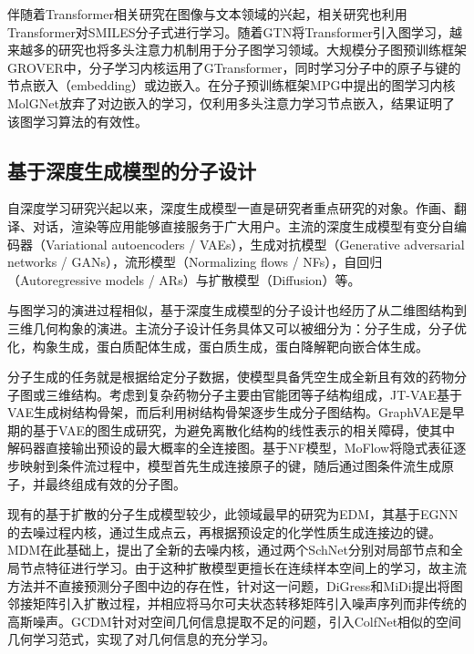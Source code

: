 伴随着Transformer\cite{transformer_vaswani_17}相关研究在图像与文本领域的兴起，相关研究\cite{smilestrans_honda_19,smilesbert_wang_19,chemberta_chithrananda_20}也利用Transformer对SMILES分子式进行学习。随着GTN\cite{gtn_yun_19}将Transformer引入图学习，越来越多的研究也将多头注意力机制用于分子图学习领域。大规模分子图预训练框架GROVER\cite{grover_rong_20}中，分子学习内核运用了GTransformer，同时学习分子中的原子与键的节点嵌入（embedding）或边嵌入。在分子预训练框架MPG\cite{mpg_li_21}中提出的图学习内核MolGNet放弃了对边嵌入的学习，仅利用多头注意力学习节点嵌入，结果证明了该图学习算法的有效性。

\subsection{基于深度生成模型的分子设计}
自深度学习研究兴起以来，深度生成模型一直是研究者重点研究的对象。作画、翻译、对话，渲染等应用能够直接服务于广大用户。主流的深度生成模型有变分自编码器（Variational autoencoders / VAEs）\cite{vae_kingma_13}，生成对抗模型（Generative adversarial networks / GANs）\cite{gan_goodfellow_14}，流形模型（Normalizing flows / NFs）\cite{nice_dinh_15,density_dinh_17}，自回归（Autoregressive models / ARs）\cite{ar_oord_16}与扩散模型（Diffusion）\cite{deepunsupervised_dickstein_15,generative_song_19}等。

与图学习的演进过程相似，基于深度生成模型的分子设计也经历了从二维图结构到三维几何构象的演进。主流分子设计任务具体又可以被细分为：分子生成，分子优化，构象生成，蛋白质配体生成，蛋白质生成，蛋白降解靶向嵌合体生成。

分子生成的任务就是根据给定分子数据，使模型具备凭空生成全新且有效的药物分子图或三维结构。考虑到复杂药物分子主要由官能团等子结构组成，JT-VAE\cite{jtvae_jin_18}基于VAE生成树结构骨架，而后利用树结构骨架逐步生成分子图结构。GraphVAE\cite{graphvae_simonovsky_18}是早期的基于VAE的图生成研究，为避免离散化结构的线性表示的相关障碍，使其中解码器直接输出预设的最大概率的全连接图。基于NF模型，MoFlow\cite{moflow_zang_20}将隐式表征逐步映射到条件流过程中，模型首先生成连接原子的键，随后通过图条件流生成原子，并最终组成有效的分子图。

现有的基于扩散的分子生成模型较少，此领域最早的研究为EDM\cite{edm_hoogeboom_22}，其基于EGNN\cite{egnn_satorras_21}的去噪过程内核，通过生成点云，再根据预设定的化学性质生成连接边的键。MDM\cite{mdm_huang_22}在此基础上，提出了全新的去噪内核，通过两个SchNet\cite{schnet_schutt_17}分别对局部节点和全局节点特征进行学习。由于这种扩散模型更擅长在连续样本空间上的学习，故主流方法并不直接预测分子图中边的存在性，针对这一问题，DiGress\cite{digress_vignac_22}和MiDi\cite{midi_vignac_23}提出将图邻接矩阵引入扩散过程，并相应将马尔可夫状态转移矩阵引入噪声序列而非传统的高斯噪声。GCDM\cite{gcdm_morehead_23}针对对空间几何信息提取不足的问题，引入ColfNet\cite{colfnet_du_22}相似的空间几何学习范式，实现了对几何信息的充分学习。

